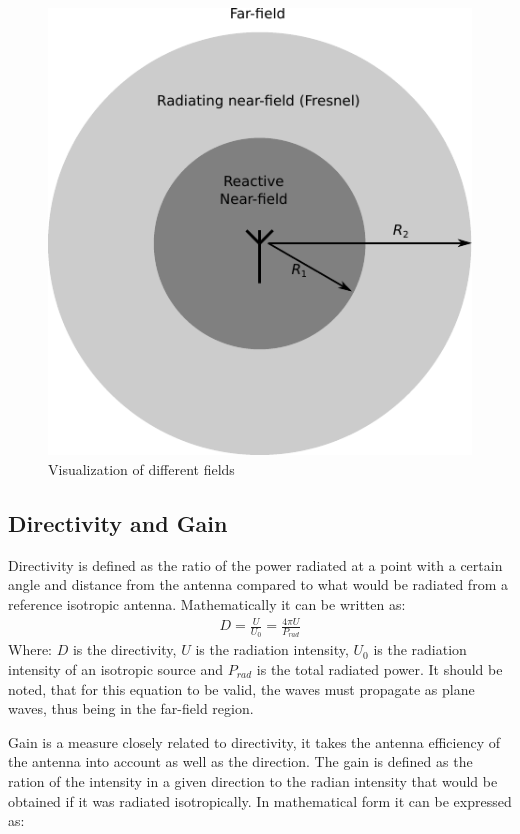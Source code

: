 \begin{figure}[htbp]
  \centering
  \includegraphics[scale=1]{img/analysis/radiationfields}
  \caption{Visualization of different fields\cite{balanis2012antenna}}
  \label{fig:field-regions}
\end{figure}

\subsection{Directivity and Gain}
\label{subsec:dir_gain}
Directivity is defined as the ratio of the power radiated at a  point with a certain angle and distance from the antenna compared to what would be radiated from a reference isotropic antenna. Mathematically it can be written as: 
\begin{align}
  D = \frac{U}{U_0} = \frac{4 \pi U}{P_{rad}} 
\end{align}
Where: $D$ is the directivity, $U$ is the radiation intensity, $U_0$ is the radiation intensity of an isotropic source and $P_{rad}$ is the total radiated power. It should be noted, that for this equation to be valid, the waves must propagate as plane waves, thus being in the far-field region. 

Gain is a measure closely related to directivity, it takes the antenna efficiency of the antenna into account as well as the direction. The gain is defined as the ration of the intensity in a given direction to the radian intensity that would be obtained if it was radiated isotropically. In mathematical form it can be expressed as: 


